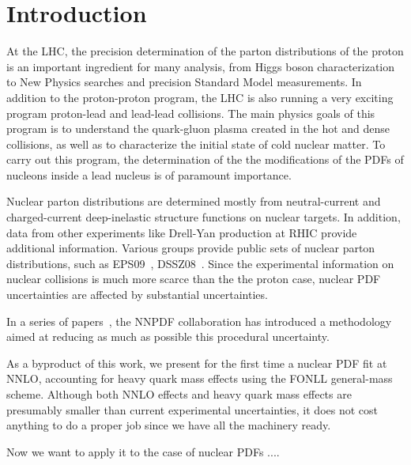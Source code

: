 \section{Introduction}
\label{sec:introduction}

At the LHC, the precision determination of the parton distributions of the proton is an important
ingredient for many analysis, from Higgs boson characterization to New Physics searches
and precision Standard Model measurements.
%
In addition to the proton-proton program, the LHC is also running a very exciting program proton-lead
and lead-lead collisions.
%
The main physics goals of this program is to understand the quark-gluon plasma
created in the hot and dense collisions, as well as to characterize the initial
state of cold nuclear matter.
%
To carry out this program, the determination of the the modifications of the PDFs of
nucleons inside a lead nucleus is of paramount importance.

Nuclear parton distributions are determined mostly from neutral-current and charged-current
deep-inelastic structure functions on nuclear targets.
%
In addition, data from other experiments like Drell-Yan production at RHIC provide additional
information.
%
Various groups provide public sets of nuclear parton distributions, such as
EPS09~\cite{Eskola:2009uj},
DSSZ08~\cite{deFlorian:2011fp}.
%
Since the experimental information on nuclear collisions is much more scarce than the the proton
case, nuclear PDF uncertainties are affected by substantial uncertainties.




In a series of
papers~\cite{Forte:2002fg,DelDebbio:2004qj,DelDebbio:2007ee,Ball:2008by,Rojo:2008ke,Ball:2009mk,Ball:2009qv,Ball:2010de,Ball:2011mu,Ball:2011uy,Ball:2012cx},
the NNPDF collaboration 
has introduced a methodology aimed at reducing as much as possible
this procedural uncertainty.

As a byproduct of this work, we present for the first time a nuclear PDF fit at NNLO, accounting for
heavy quark mass effects using the FONLL general-mass scheme.
%
Although both NNLO effects and heavy quark mass effects are presumably smaller than current
experimental uncertainties, it does not cost anything to do a proper job since we
have all the machinery ready.

Now we want to apply it to the case of nuclear PDFs ....

